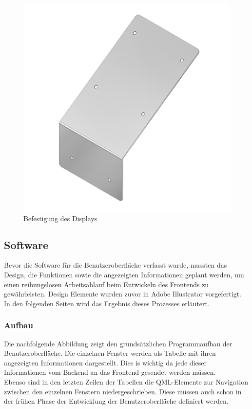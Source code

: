 \begin{figure}[H]
	\begin{center}
		\includegraphics[scale=0.18]{figures/hcis/befestigung_display.png}
		\caption{Befestigung des Displays}
		\label{fig:befestigung}
	\end{center}
\end{figure}

\subsection{Software}
Bevor die Software für die Benutzeroberfläche verfasst wurde, mussten das Design, die Funktionen sowie die angezeigten Informationen geplant werden, um einen reibungslosen Arbeitsablauf beim Entwickeln des Frontends zu gewährleisten. Design Elemente wurden zuvor in Adobe Illustrator vorgefertigt. In den folgenden Seiten wird das Ergebnis dieses Prozesses erläutert.
\subsubsection{Aufbau}
Die nachfolgende Abbildung zeigt den grundsätzlichen Programmaufbau der Benutzeroberfläche. Die einzelnen Fenster werden als Tabelle mit ihren angezeigten Informationen dargestellt. Dies is wichtig da jede dieser Informationen vom Backend an das Frontend gesendet werden müssen.\\
Ebenso sind in den letzten Zeilen der Tabellen die QML-Elemente  zur Navigation zwischen den einzelnen Fenstern niedergeschrieben. Diese müssen auch schon in der frühen Phase der Entwicklung der Benutzeroberfläche definiert werden.

